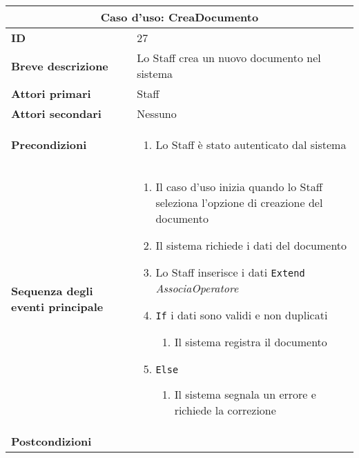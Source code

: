 \documentclass[a4paper]{report}
\begin{document}
\begin{table}[H]
\vspace*{-0cm}
\begin{tabular}{|p{3.9cm}|p{9.9cm}|}
\hline
\multicolumn{2}{|c|}{\textbf{Caso d’uso: CreaDocumento}} \\ \hline
	\textbf{ID} & 27 \\ \hline
	\textbf{Breve descrizione} & Lo Staff crea un nuovo documento nel sistema \\ \hline
	\textbf{Attori primari} & Staff \\ \hline
	\textbf{Attori secondari} & Nessuno \\ \hline
	\textbf{Precondizioni} & \begin{enumerate}[leftmargin=14pt,label=\arabic*.,labelsep=0.5em,topsep=0pt,partopsep=0pt,parsep=0pt,itemsep=0pt]
        \item Lo Staff è stato autenticato dal sistema
    \end{enumerate} \\ \hline
	\textbf{Sequenza degli eventi principale} &
\begin{enumerate}[leftmargin=14pt,label=\arabic*.,labelsep=0.5em,topsep=0pt,partopsep=0pt,parsep=0pt,itemsep=0pt]
    \item Il caso d’uso inizia quando lo Staff seleziona l'opzione di creazione del documento
    \item Il sistema richiede i dati del documento
    \item Lo Staff inserisce i dati
    \newline \texttt{Extend} \textit{AssociaOperatore}
    \item \texttt{If} i dati sono validi e non duplicati
    \begin{enumerate}[label=\arabic{enumi}.\arabic*.,leftmargin=22pt,labelsep=0.5em,topsep=0pt,partopsep=0pt,parsep=0pt,itemsep=0pt]
        \item Il sistema registra il documento
    \end{enumerate}
    \item \texttt{Else}
    \begin{enumerate}[label=\arabic{enumi}.\arabic*.,leftmargin=22pt,labelsep=0.5em,topsep=0pt,partopsep=0pt,parsep=0pt,itemsep=0pt]
        \item Il sistema segnala un errore e richiede la correzione
    \end{enumerate}
\end{enumerate}\\ \hline
	\textbf{Postcondizioni} & \begin{enumerate}[label=\arabic*.,leftmargin=14pt,labelsep=0.5em,topsep=0pt,partopsep=0pt,parsep=0pt,itemsep=0pt]

\end{enumerate}
\end{tabular}
\end{table}
\end{document}
